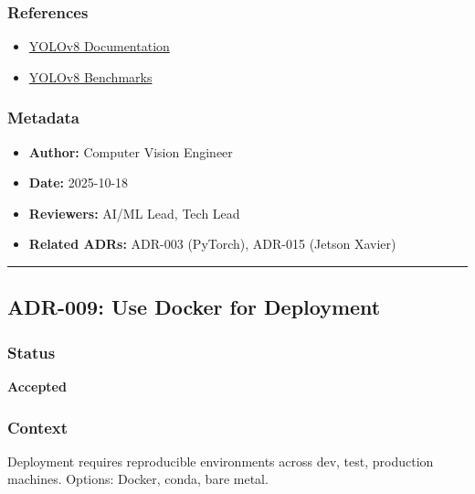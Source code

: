\documentclass[
]{article}
\providecommand{\tightlist}{%
  \setlength{\itemsep}{0pt}\setlength{\parskip}{0pt}}
\begin{document}
\hypertarget{references-7}{%
\subsubsection{References}\label{references-7}}

\begin{itemize}
\tightlist
\item
  \href{https://docs.ultralytics.com/}{YOLOv8 Documentation}
\item
  \href{https://github.com/ultralytics/ultralytics\#benchmarks}{YOLOv8
  Benchmarks}
\end{itemize}

\hypertarget{metadata-7}{%
\subsubsection{Metadata}\label{metadata-7}}

\begin{itemize}
\tightlist
\item
  \textbf{Author:} Computer Vision Engineer
\item
  \textbf{Date:} 2025-10-18
\item
  \textbf{Reviewers:} AI/ML Lead, Tech Lead
\item
  \textbf{Related ADRs:} ADR-003 (PyTorch), ADR-015 (Jetson Xavier)
\end{itemize}

\begin{center}\rule{0.5\linewidth}{0.5pt}\end{center}

\hypertarget{adr-009-use-docker-for-deployment}{%
\subsection{ADR-009: Use Docker for
Deployment}\label{adr-009-use-docker-for-deployment}}

\hypertarget{status-8}{%
\subsubsection{Status}\label{status-8}}

\textbf{Accepted}

\hypertarget{context-8}{%
\subsubsection{Context}\label{context-8}}

Deployment requires reproducible environments across dev, test,
production machines. Options: Docker, conda, bare metal.
\end{document}
